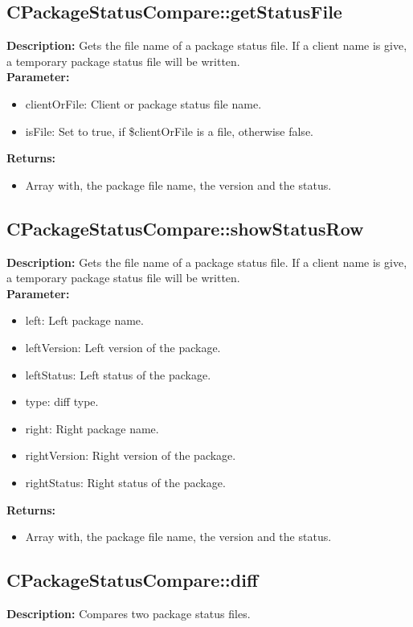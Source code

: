 \subsection{CPackageStatusCompare::getStatusFile}
\textbf{Description:} Gets the file name of a package status file. If a client name is give, a temporary package status file will be written.\\
\textbf{Parameter:}
\begin{itemize}
\item clientOrFile: Client or package status file name.
\item isFile: Set to true, if \$clientOrFile is a file, otherwise false.
\end{itemize}
\textbf{Returns:}
\begin{itemize}
\item Array with, the package file name, the version and the status.
\end{itemize}

\subsection{CPackageStatusCompare::showStatusRow}
\textbf{Description:} Gets the file name of a package status file. If a client name is give, a temporary package status file will be written.\\
\textbf{Parameter:}
\begin{itemize}
\item left: Left package name.
\item leftVersion: Left version of the package.
\item leftStatus: Left status of the package.
\item type: diff type.
\item right: Right package name.
\item rightVersion: Right version of the package.
\item rightStatus: Right status of the package.
\end{itemize}
\textbf{Returns:}
\begin{itemize}
\item Array with, the package file name, the version and the status.
\end{itemize}

\subsection{CPackageStatusCompare::diff}
\textbf{Description:} Compares two package status files.\\

